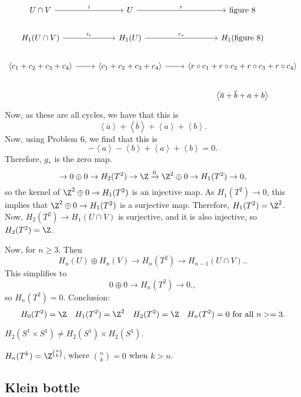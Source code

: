     \[
        \begin{tikzcd}
            U \cap V \arrow[r, "i"] & U \arrow[r, "r"] & \text{figure 8}\\
            H_1(U \cap V) \arrow[r, "i_r"] & H_1(U) \arrow[r, "r_*"] & H_1(\text{figure 8})\\
            \left<c_1 + c_2 + c_3 + c_4 \right> \arrow[r, ""] & \left<c_1+ c_2 +c_3 +c_4 \right> \arrow[r, ""] & \left<r  \circ  c_1 + r  \circ  c_2 + r  \circ  c_3 + r  \circ  c_4 \right>\\
                                  && \left< \overline{a} + \overline{b} + a + b \right>
        \end{tikzcd}
    \]
    Now, as these are all cycles, we have that this is 
    \[
    \left<\overline{a} \right> + \left<\overline{b} \right> + \left<a \right> + \left<b \right>
    .\] 
    Now, using Problem 6, we find that this is
    \[
    - \left<a \right> - \left<b \right> + \left<a \right> + \left<b \right> = 0
    .\] 
    Therefore, $g_*$ is the zero map.
    \[
        \to  0 \oplus 0 \to  H_2(T^2) \to  \Z \xrightarrow{0}   \Z^2 \oplus 0 \to  H_1(T^2) \to  0
    ,\] 
    so the kernel of $\Z^2 \oplus 0 \to  H_1(T^2)$ is an injective map.
    As $H_1(T^2) \to  0$, this implies that $\Z^2 \oplus 0 \to  H_1(T^2)$ is a surjective map.
    Therefore, $H_1(T^2) = \Z^2$.
    Now, $H_2(T^2) \to H_1(U \cap V)$ is surjective, and it is also injective, so $H_2(T^2) = \Z$.
    


Now, for $n \ge  3$.
Then
\[
    H_n(U) \oplus H_n(V) \to  H_n(T^2) \to  H_{n-1}(U \cap V).
.\] 
This simplifies  to
\[
    0 \oplus 0 \to  H_n(T^2) \to 0.
,\] 
so $H_n(T^2) = 0$.
Conclusion:
\[
    H_0(T^2) = \Z \quad 
    H_1(T^2) = \Z^2 \quad 
    H_2(T^2) = \Z \quad 
    H_n(T^2) = 0 \text{ for all $ n > =3$}
.\] 
\begin{remark}
    $H_2(S^1 \times S^1) \neq H_2(S^{1}) \times H_2(S^{1})$.
\end{remark}


\begin{remark}
    $H_n(T^{k}) = \Z^{n \choose k}$, where ${n \choose k} = 0$ when  $k > n$.
\end{remark}




\subsection*{Klein bottle}

